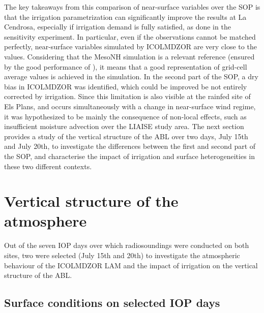 \hfill

The key takeaways from this comparison of near-surface variables over the SOP is that the irrigation parametrization can significantly improve the results at La Cendrosa, especially if irrigation demand is fully satisfied, as done in the \irrboost sensitivity experiment.
In particular, even if the observations cannot be matched perfectly, near-surface variables simulated by ICOLMDZOR are very close to the \mesomean values. Considering that the MesoNH simulation is a relevant reference (ensured by the good performance of \mesoexact), it means that a good representation of grid-cell average values is achieved in the \irrboost simulation. 
In the second part of the SOP, a dry bias in ICOLMDZOR was identified, which could be improved be not entirely corrected by irrigation. Since this limitation is also visible at the rainfed site of Els Plans, and occurs simultaneously with a change in near-surface wind regime, it was hypothesized to be mainly the consequence of non-local effects, such as insufficient moisture advection over the LIAISE study area. The next section provides a study of the vertical structure of the ABL over two days, July 15th and July 20th, to investigate the differences between the first and second part of the SOP, and characterise the impact of irrigation and surface heterogeneities in these two different contexts.
\clearpage %

\section{Vertical structure of the atmosphere}
\label{sec:iop}

Out of the seven IOP days over which radiosoundings were conducted on both sites, two were selected (July 15th and 20th) to investigate the atmospheric behaviour of the ICOLMDZOR LAM and the impact of irrigation on the vertical structure of the ABL.

\subsection{Surface conditions on selected IOP days}

